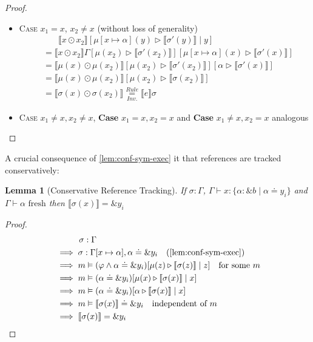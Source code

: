\documentclass[twoside, english]{sdqthesis}
\newcommand{\bbracket}[1]{\llbracket #1 \rrbracket}
\newcommand{\tr}[0]{\triangleright}
\newtheorem{lemma}[theorem]{Lemma}
\theoremstyle{definition}
\begin{document}
\begin{proof}
\begin{itemize}
\begin{itemize}
\begin{itemize}
              \begin{itemize}
                \item \textsc{Case $x_1=x$, $x_2 \neq x$} (without loss of generality)
                \begin{align*}
                  &\phantom{=}\ \ \bbracket{x \odot x_2}[\mu[x\mapsto \alpha](y) \tr \bbracket{\sigma'(y)} \mid y]
                  \\ &=\bbracket{x \odot x_2}\Gamma[\mu(x_2)\tr \bbracket{\sigma'(x_2)}][\mu[x \mapsto \alpha](x) \tr \bbracket{\sigma'(x)}]
                  \\ &=\bbracket{\mu(x) \odot \mu(x_2)}[\mu(x_2)\tr \bbracket{\sigma'(x_2)}][\alpha \tr \bbracket{\sigma'(x)}]
                  \\ &=\bbracket{\mu(x) \odot \mu(x_2)}[\mu(x_2)\tr \bbracket{\sigma(x_2)}]
                  \\ &=\bbracket{\sigma(x) \odot \sigma(x_2)} \underset{Inv.}{\overset{Rule}{=}} \bbracket{e}\sigma
                \end{align*}
                \item \textsc{Case} $x_1\neq x, x_2 \neq x$, \textbf{Case} $x_1 = x, x_2 = x$ and \textbf{Case} $x_1 \neq x, x_2 = x$ analogous
              \end{itemize}
          \end{itemize}
      \end{itemize}
  \end{itemize}
\end{proof}

A crucial consequence of \cref{lem:conf-sym-exec} it that references are tracked conservatively:
\begin{lemma}[Conservative Reference Tracking]\label{lem:conservative-ref-tracking}
 If $\sigma : \Gamma$, $\Gamma \vdash x : \{ \alpha : \&b \mid \alpha \doteq y_i \}$ and $ \Gamma \vdash \alpha \text{ fresh}  $ then $\bbracket{\sigma(x)} = \&y_i$
\end{lemma}

\begin{proof}
  \begin{align*}
    &\phantom{\implies}\ \ \sigma : \Gamma 
    \\ &\implies \sigma : \Gamma[x \mapsto \alpha], \alpha \doteq \&y_i \quad (\cref{lem:conf-sym-exec})
    \\ &\implies m \vDash (\varphi \wedge \alpha \doteq \&y_i)[\mu(z) \tr \bbracket{\sigma(z)} \mid z] \quad \text{for some }m
    \\ &\implies m \vDash (\alpha \doteq \&y_i)[\mu(x) \tr \bbracket{\sigma(x)} \mid x]
    \\ &\implies m \vDash (\alpha \doteq \&y_i)[\alpha \tr \bbracket{\sigma(x)} \mid x]
    \\ &\implies m \vDash \bbracket{\sigma(x)} \doteq \&y_i \quad \text{independent of $m$}
    \\ &\implies  \bbracket{\sigma(x)} = \&y_i
  \end{align*}
\end{proof}
\end{document}
